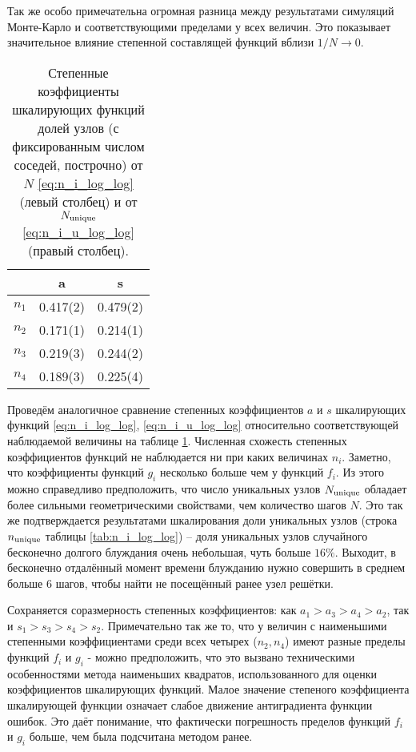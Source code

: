 Так же особо примечательна огромная разница между результатами симуляций Монте-Карло и соответствующими пределами у всех величин.
Это показывает значительное влияние степенной составлящей функций вблизи $1/N \to 0$.

\begin{table}[h]
\centering
\begin{tabular}{|c|c|c|}
\hline
 & a & s \\ \hline
$n_1$ & 0.417(2) & 0.479(2) \\ \hline
$n_2$ & 0.171(1) & 0.214(1) \\ \hline
$n_3$ & 0.219(3) & 0.244(2) \\ \hline
$n_4$ & 0.189(3) & 0.225(4) \\ \hline
\end{tabular}
\caption{Степенные коэффициенты шкалирующих функций долей узлов (с фиксированным числом соседей, построчно) от $N$ \eqref{eq:n_i_log_log} (левый столбец) и от $N_{\textup{unique}}$ \eqref{eq:n_i_u_log_log} (правый столбец).}
\label{tab:as_compare}
\end{table}

Проведём аналогичное сравнение степенных коэффициентов $a$ и $s$ шкалирующих функций \eqref{eq:n_i_log_log}, \eqref{eq:n_i_u_log_log} относительно соответствующей наблюдаемой величины на таблице \ref{tab:as_compare}. 
Численная схожесть степенных коэффициентов функций не наблюдается ни при каких величинах $n_i$.
Заметно, что коэффициенты функций $g_i$ несколько больше чем у функций $f_i$.
Из этого можно справедливо предположить, что число уникальных узлов $N_{\textup{unique}}$ обладает более сильными геометрическими свойствами, чем количество шагов $N$. 
Это так же подтверждается результатами шкалирования доли уникальных узлов (строка $n_{\textup{unique}}$ таблицы \ref{tab:n_i_log_log}) -- доля уникальных узлов случайного бесконечно долгого блуждания очень небольшая, чуть больше $16\%$.
Выходит, в бесконечно отдалённый момент времени блужданию нужно совершить в среднем больше 6 шагов, чтобы найти не посещённый ранее узел решётки.

Сохраняется соразмерность степенных коэффициентов: как $a_1 > a_3 > a_4 > a_2$, так и $s_1 > s_3 > s_4 > s_2$. 
Примечательно так же то, что у величин с наименьшими степенными коэффициентами среди всех четырех ($n_2, n_4$) имеют разные пределы функций $f_i$ и $g_i$ - можно предположить, что это вызвано техническими особенностями метода наименьших квадратов, использованного для оценки коэффициентов шкалирующих функций.
Малое значение степеного коэффициента шкалирующей функции означает слабое движение антиградиента функции ошибок.
Это даёт понимание, что фактически погрешность пределов функций $f_i$ и $g_i$ больше, чем была подсчитана методом ранее. 


